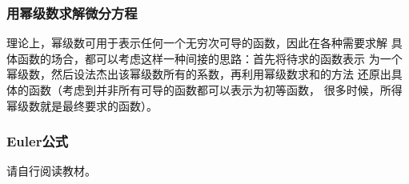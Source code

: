 \subsubsection{用幂级数求解微分方程}

理论上，幂级数可用于表示任何一个无穷次可导的函数，因此在各种需要求解
具体函数的场合，都可以考虑这样一种间接的思路：首先将待求的函数表示
为一个幂级数，然后设法杰出该幂级数所有的系数，再利用幂级数求和的方法
还原出具体的函数（考虑到并非所有可导的函数都可以表示为初等函数，
很多时候，所得幂级数就是最终要求的函数）。

\subsubsection{Euler公式}

请自行阅读教材。

\bs

